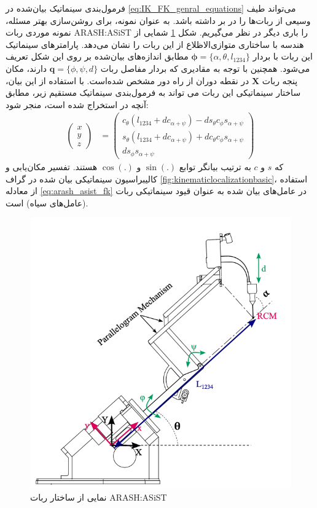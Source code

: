 فرمول‌بندی سینماتیک بیان‌شده در 
\ref{eq:IK_FK_genral_equations}
می‌تواند طیف وسیعی از ربات‌ها را در بر داشته باشد. به عنوان نمونه، برای روشن‌سازی بهتر مسئله، نمونه موردی ربات
ARASH:ASiST
را باری دیگر در نظر می‌گیریم. شکل
\ref{fig:arashasiststructure}
شمایی از هندسه با ساختاری متوازی‌الاظلاع از این ربات را نشان می‌دهد. پارامترهای سینماتیک این ربات با بردار
$\boldsymbol{\phi} = \{ \alpha, \theta , l_{1234} \} $
مطابق اندازه‌های بیان‌شده بر روی این شکل تعریف می‌شود. همچنین با توجه به مقادیری که بردار مفاصل ربات 
$ \boldsymbol{q}=\{ \phi, \psi, d \} $
دارند، مکان پنجه ربات
$\boldsymbol{X}$
در نقطه دوران از راه دور مشخص شده‌است. با استفاده از این بیان، ساختار سینماتیکی این ربات می تواند به فرمول‌بندی سینماتیک مستقیم زیر، مطابق آنچه در
\cite{hassani2021kinematic}
استخراج شده است، منجر شود:
\begin{equation} \label{eq:arash_asist_fk}
		\begin{aligned}
			\left( \begin{array}{c}
				x \\
				y \\
				z 
			\end{array} \right)
			&=
			\left( \begin{array}{c}
				c_{\theta}(l_{1234} + dc_{\alpha + \psi}) - ds_{\theta}c_{\phi}s_{\alpha + \psi} \\
				s_{\theta}(l_{1234} + dc_{\alpha + \psi}) + d c_{\theta}c_{\phi}s_{\alpha + \psi} \\
				ds_{\phi} s_{\alpha + \psi}
			\end{array} \right)
		\end{aligned}
\end{equation}
که $s$ و $c$ به ترتیب بیانگر توابع 
$\sin(.)$
و
$\cos(.)$
هستند. تفسیر مکان‌یابی و کالیبراسیون سینماتیکی بیان شده در گراف
\ref{fig:kinematiclocalizationbasic}،
استفاده از معادله
\ref{eq:arash_asist_fk}
در عامل‌های بیان شده به عنوان قیود سینماتیکی ربات (عامل‌های سیاه) است. 

\begin{figure}
	\centering
	\includegraphics[width=0.5\linewidth]{img/ARASH_ASIST_Structure}
	\caption{نمایی از ساختار ربات ARASH:ASiST}
	\label{fig:arashasiststructure}
\end{figure}


